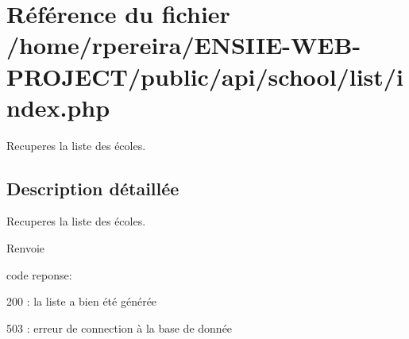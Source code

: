 \hypertarget{school_2list_2index_8php}{}\section{Référence du fichier /home/rpereira/\+E\+N\+S\+I\+I\+E-\/\+W\+E\+B-\/\+P\+R\+O\+J\+E\+C\+T/public/api/school/list/index.php}
\label{school_2list_2index_8php}


Recuperes la liste des écoles.  




\subsection{Description détaillée}
Recuperes la liste des écoles. 

\begin{DoxyReturn}{Renvoie}

\begin{DoxyItemize}
\item code reponse\+:
\begin{DoxyItemize}
\item 200 \+: la liste a bien été générée
\item 503 \+: erreur de connection à la base de donnée 
\end{DoxyItemize}
\end{DoxyItemize}
\end{DoxyReturn}
